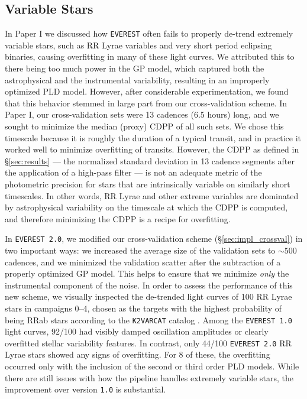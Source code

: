 \documentclass[]{emulateapj}
\begin{document}
\subsection{Variable Stars}
\label{sec:variables}
In Paper I we discussed how \texttt{EVEREST} often fails to properly de-trend
extremely variable stars, such as RR Lyrae variables and very short period eclipsing
binaries, causing overfitting in many of these light curves. We attributed this to 
there being too much power in the GP model, which
captured both the astrophysical and the instrumental variability, resulting in an
improperly optimized PLD model. However, after considerable experimentation, we
found that this behavior stemmed in large part from our cross-validation scheme.
In Paper I, our cross-validation sets were 13 cadences (6.5 hours) long, and we sought to
minimize the median (proxy) CDPP of all such sets. We chose this timescale
because it is roughly the duration of a typical transit, and in practice
it worked well to minimize overfitting of transits. However, the CDPP as defined in
\S\ref{sec:results} --- the normalized standard deviation in 13 cadence segments
after the application of a high-pass filter --- is not an adequate metric of the
photometric precision for stars that are intrinsically variable on similarly short 
timescales. In other words, RR Lyrae and other extreme variables are dominated by astrophysical
variability on the timescale at which the CDPP is computed, and therefore 
minimizing the CDPP is a recipe for overfitting.

In \texttt{EVEREST 2.0}, we modified our cross-validation scheme (\S\ref{sec:impl_crossval})
in two important ways: we increased the average size of the validation sets to
${\sim}500$ cadences, and we minimized the validation scatter after the subtraction of
a properly optimized GP model. This helps to ensure that we minimize \emph{only} the instrumental
component of the noise. In order to assess the performance of this new scheme, we
visually inspected the de-trended light curves of 100 RR Lyrae stars in campaigns 0--4,
chosen as the targets with the highest probability of being RRab stars
according to the \texttt{K2VARCAT} catalog \citep{Armstrong16}.
Among the \texttt{EVEREST 1.0} light curves, 92/100 had visibly damped
oscillation amplitudes or clearly overfitted stellar variability features. In contrast,
only 44/100 \texttt{EVEREST 2.0} RR Lyrae stars showed any signs of overfitting. For 8
of these, the overfitting occurred only with the inclusion of the second or third order PLD
models. While there are still issues with how the pipeline handles extremely variable
stars, the improvement over version \texttt{1.0} is substantial. 
\end{document}
